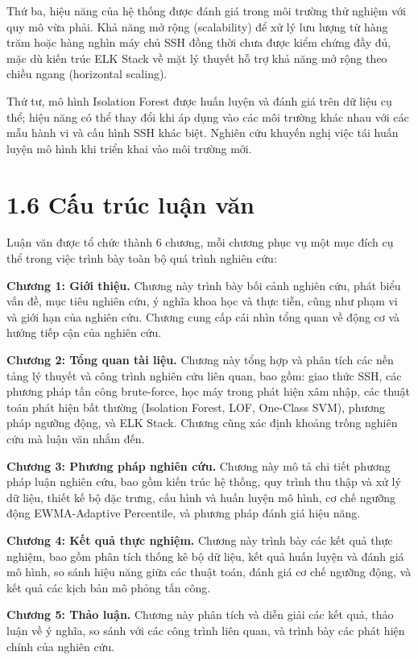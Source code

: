 \documentclass[
  a4paper]{report}
\begin{document}
Thứ ba, hiệu năng của hệ thống được đánh giá trong môi trường thử nghiệm
với quy mô vừa phải. Khả năng mở rộng (scalability) để xử lý lưu lượng
từ hàng trăm hoặc hàng nghìn máy chủ SSH đồng thời chưa được kiểm chứng
đầy đủ, mặc dù kiến trúc ELK Stack về mặt lý thuyết hỗ trợ khả năng mở
rộng theo chiều ngang (horizontal scaling).

Thứ tư, mô hình Isolation Forest được huấn luyện và đánh giá trên dữ
liệu cụ thể; hiệu năng có thể thay đổi khi áp dụng vào các môi trường
khác nhau với các mẫu hành vi và cấu hình SSH khác biệt. Nghiên cứu
khuyến nghị việc tái huấn luyện mô hình khi triển khai vào môi trường
mới.

\section{1.6 Cấu trúc luận
văn}\label{cux1ea5u-truxfac-luux1eadn-vux103n}

Luận văn được tổ chức thành 6 chương, mỗi chương phục vụ một mục đích cụ
thể trong việc trình bày toàn bộ quá trình nghiên cứu:

\textbf{Chương 1: Giới thiệu.} Chương này trình bày bối cảnh nghiên cứu,
phát biểu vấn đề, mục tiêu nghiên cứu, ý nghĩa khoa học và thực tiễn,
cũng như phạm vi và giới hạn của nghiên cứu. Chương cung cấp cái nhìn
tổng quan về động cơ và hướng tiếp cận của nghiên cứu.

\textbf{Chương 2: Tổng quan tài liệu.} Chương này tổng hợp và phân tích
các nền tảng lý thuyết và công trình nghiên cứu liên quan, bao gồm: giao
thức SSH, các phương pháp tấn công brute-force, học máy trong phát hiện
xâm nhập, các thuật toán phát hiện bất thường (Isolation Forest, LOF,
One-Class SVM), phương pháp ngưỡng động, và ELK Stack. Chương cũng xác
định khoảng trống nghiên cứu mà luận văn nhắm đến.

\textbf{Chương 3: Phương pháp nghiên cứu.} Chương này mô tả chi tiết
phương pháp luận nghiên cứu, bao gồm kiến trúc hệ thống, quy trình thu
thập và xử lý dữ liệu, thiết kế bộ đặc trưng, cấu hình và huấn luyện mô
hình, cơ chế ngưỡng động EWMA-Adaptive Percentile, và phương pháp đánh
giá hiệu năng.

\textbf{Chương 4: Kết quả thực nghiệm.} Chương này trình bày các kết quả
thực nghiệm, bao gồm phân tích thống kê bộ dữ liệu, kết quả huấn luyện
và đánh giá mô hình, so sánh hiệu năng giữa các thuật toán, đánh giá cơ
chế ngưỡng động, và kết quả các kịch bản mô phỏng tấn công.

\textbf{Chương 5: Thảo luận.} Chương này phân tích và diễn giải các kết
quả, thảo luận về ý nghĩa, so sánh với các công trình liên quan, và
trình bày các phát hiện chính của nghiên cứu.
\end{document}
